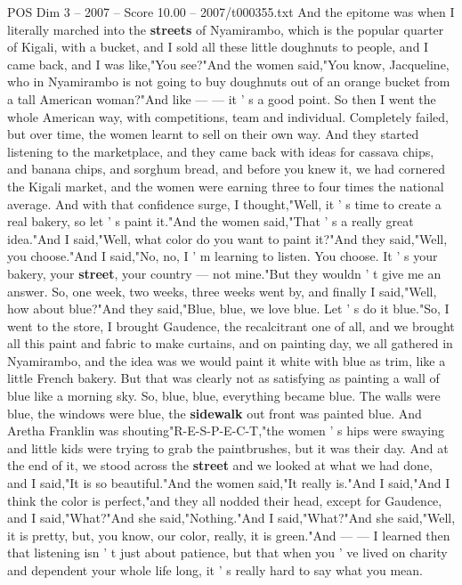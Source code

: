 \begin{textsample}{POS Dim 3 – 2007 – Score 10.00 – 2007/t000355.txt}
And the epitome was when I literally marched into the \textbf{streets} of Nyamirambo, which is the popular quarter of Kigali, with a bucket, and I sold all these little doughnuts to people, and I came back, and I was like,"You see?"And the women said,"You know, Jacqueline, who in Nyamirambo is not going to buy doughnuts out of an orange bucket from a tall American woman?"And like — — it ' s a good point.
So then I went the whole American way, with competitions, team and individual.
Completely failed, but over time, the women learnt to sell on their own way.
And they started listening to the marketplace, and they came back with ideas for cassava chips, and banana chips, and sorghum bread, and before you knew it, we had cornered the Kigali market, and the women were earning three to four times the national average.
And with that confidence surge, I thought,"Well, it ' s time to create a real bakery, so let ' s paint it."And the women said,"That ' s a really great idea."And I said,"Well, what color do you want to paint it?"And they said,"Well, you choose."And I said,"No, no, I ' m learning to listen.
You choose.
It ' s your bakery, your \textbf{street}, your country — not mine."But they wouldn ' t give me an answer.
So, one week, two weeks, three weeks went by, and finally I said,"Well, how about blue?"And they said,"Blue, blue, we love blue.
Let ' s do it blue."So, I went to the store, I brought Gaudence, the recalcitrant one of all, and we brought all this paint and fabric to make curtains, and on painting day, we all gathered in Nyamirambo, and the idea was we would paint it white with blue as trim, like a little French bakery.
But that was clearly not as satisfying as painting a wall of blue like a morning sky.
So, blue, blue, everything became blue.
The walls were blue, the windows were blue, the \textbf{sidewalk} out front was painted blue.
And Aretha Franklin was shouting"R-E-S-P-E-C-T,"the women ' s hips were swaying and little kids were trying to grab the paintbrushes, but it was their day.
And at the end of it, we stood across the \textbf{street} and we looked at what we had done, and I said,"It is so beautiful."And the women said,"It really is."And I said,"And I think the color is perfect,"and they all nodded their head, except for Gaudence, and I said,"What?"And she said,"Nothing."And I said,"What?"And she said,"Well, it is pretty, but, you know, our color, really, it is green."And — — I learned then that listening isn ' t just about patience, but that when you ' ve lived on charity and dependent your whole life long, it ' s really hard to say what you mean.

\end{textsample}
